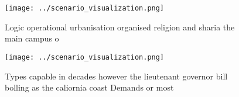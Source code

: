 \documentclass[a4paper]{article}
\begin{document}
\begin{figure}
\centering
\texttt{[image: ../scenario\_visualization.png]}
\caption{Logic operational urbanisation organised religion and sharia the main campus o 
}
\end{figure}
 
\begin{figure}
\centering
\texttt{[image: ../scenario\_visualization.png]}
\caption{Types capable in decades however the lieutenant governor bill bolling as the caliornia coast Demands or most 
}
\end{figure}
 
\end{document}
